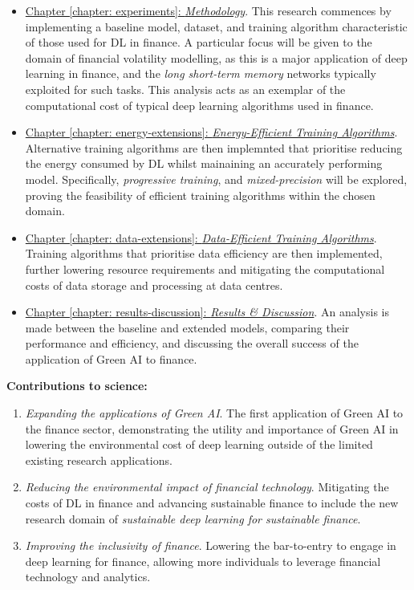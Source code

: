 \documentclass[a4paper, 11pt]{report}
\begin{document}
    \begin{itemize}
        \item \underline{Chapter \ref{chapter: experiments}: \emph{Methodology}}. This research commences by implementing a baseline model, dataset, and training algorithm characteristic of those used for DL in finance. A particular focus will be given to the domain of financial volatility modelling, as this is a major application of deep learning in finance, and the \emph{long short-term memory} networks typically exploited for such tasks. This analysis acts as an exemplar of the computational cost of typical deep learning algorithms used in finance.

        \item \underline{Chapter \ref{chapter: energy-extensions}: \emph{Energy-Efficient Training Algorithms}}. Alternative training algorithms are then implemnted that prioritise reducing the energy consumed by DL whilst mainaining an accurately performing model. Specifically, \emph{progressive training}, and \emph{mixed-precision} will be explored, proving the feasibility of efficient training algorithms within the chosen domain.
        
        \item \underline{Chapter \ref{chapter: data-extensions}: \emph{Data-Efficient Training Algorithms}}. Training algorithms that prioritise data efficiency are then implemented, further lowering resource requirements and mitigating the computational costs of data storage and processing at data centres.
        
        \item \underline{Chapter \ref{chapter: results-discussion}: \emph{Results \& Discussion}}. An analysis is made between the baseline and extended models, comparing their performance and efficiency, and discussing the overall success of the application of Green AI to finance.
    \end{itemize}

    \textbf{Contributions to science:} 
    \begin{enumerate}
        \item \emph{Expanding the applications of Green AI}. The first application of Green AI to the finance sector, demonstrating the utility and importance of Green AI in lowering the environmental cost of deep learning outside of the limited existing research applications. 

        \item \emph{Reducing the environmental impact of financial technology}. Mitigating the costs of DL in finance and advancing sustainable finance to include the new research domain of \emph{sustainable deep learning for sustainable finance}. 

        \item \emph{Improving the inclusivity of finance}. Lowering the bar-to-entry to engage in deep learning for finance,  allowing more individuals to leverage financial technology and analytics.
    \end{enumerate}
    
\end{document}
